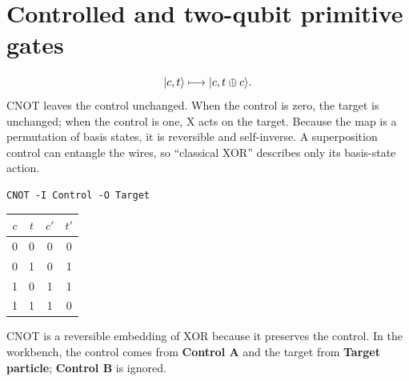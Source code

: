 \section{Controlled and two-qubit primitive gates}


\[
\lvert c,t\rangle\longmapsto\lvert c,t\oplus c\rangle.
\]
CNOT leaves the control unchanged. When the control is zero, the target is
unchanged; when the control is one, X acts on the target. Because the map is a
permutation of basis states, it is reversible and self-inverse. A
superposition control can entangle the wires, so ``classical XOR'' describes
only its basis-state action.
\begin{lstlisting}
CNOT -I Control -O Target
\end{lstlisting}
\begin{center}
\begin{tabular}{cc|cc}\toprule $c$&$t$&$c'$&$t'$\\\midrule
0&0&0&0\\0&1&0&1\\1&0&1&1\\1&1&1&0\\\bottomrule
\end{tabular}
\end{center}
CNOT is a reversible embedding of XOR because it preserves the control.
In the workbench, the control comes from \textbf{Control A} and the target
from \textbf{Target particle}; \textbf{Control B} is ignored.

\hypertarget{ccnot-and-embedding}{}

